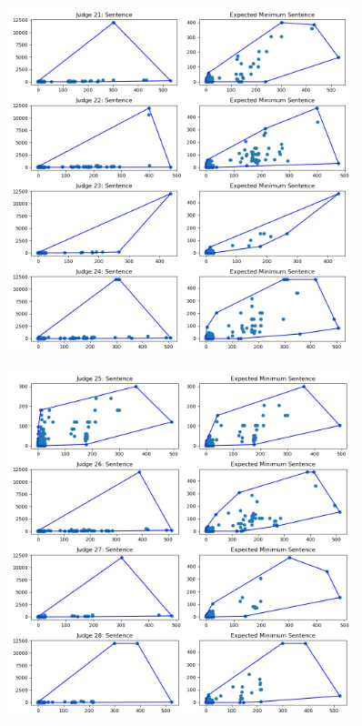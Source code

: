 \documentclass[11pt]{article}
\begin{document}
  \begin{figure}[H]
    \centering
    \includegraphics[width=0.9\textwidth]{../../../output/figures/Exploration/judge_convex_hulls_5.png}
  \end{figure}

  \begin{figure}[H]
    \centering
    \includegraphics[width=0.9\textwidth]{../../../output/figures/Exploration/judge_convex_hulls_6.png}
  \end{figure}
\end{document}

